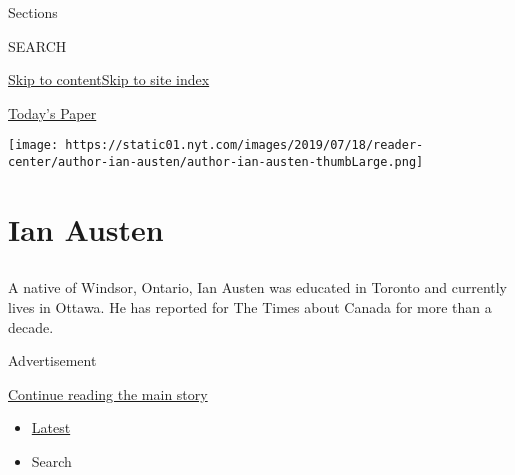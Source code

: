 Sections

SEARCH

\protect\hyperlink{site-content}{Skip to
content}\protect\hyperlink{site-index}{Skip to site index}

\href{https://myaccount.nytimes.com/auth/login?response_type=cookie\&client_id=vi}{}

\href{https://www.nytimes.com/section/todayspaper}{Today's Paper}

\texttt{[image: https://static01.nyt.com/images/2019/07/18/reader-center/author-ian-austen/author-ian-austen-thumbLarge.png]}

\hypertarget{ian-austen}{%
\section{Ian Austen}\label{ian-austen}}

\subsection{}

A native of Windsor, Ontario, Ian Austen was educated in Toronto and
currently lives in Ottawa. He has reported for The Times about Canada
for more than a decade.

Advertisement

\protect\hyperlink{after-mid1}{Continue reading the main story}

\begin{itemize}
\tightlist
\item
  \protect\hyperlink{stream-panel}{Latest}
\item
  Search
\end{itemize}


